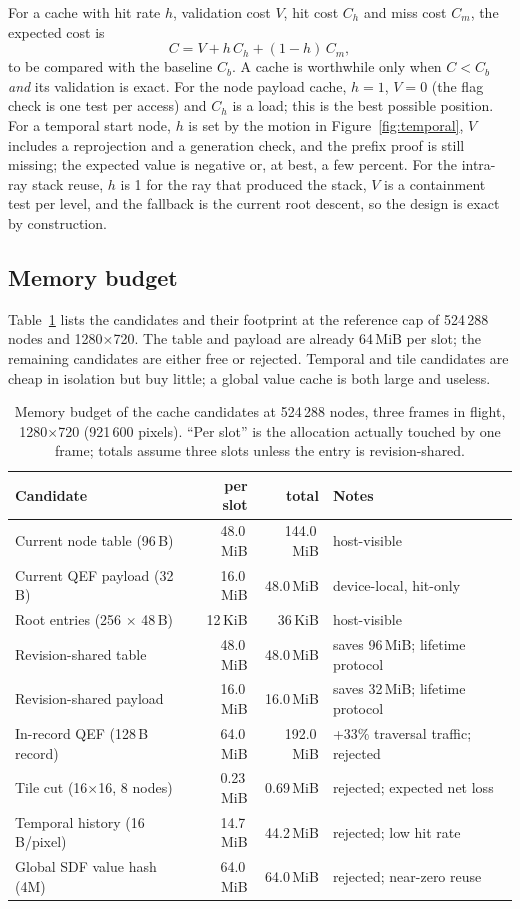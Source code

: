 \documentclass[11pt,a4paper]{article}
\theoremstyle{plain}
\theoremstyle{definition}
\theoremstyle{remark}
\begin{document}
For a cache with hit rate $h$, validation cost $V$, hit cost $C_h$ and miss
cost $C_m$, the expected cost is
\begin{equation}
C = V + h\,C_h + (1-h)\,C_m ,
\end{equation}
to be compared with the baseline $C_b$. A cache is worthwhile only when
$C<C_b$ \emph{and} its validation is exact. For the node payload cache,
$h=1$, $V=0$ (the flag check is one test per access) and $C_h$ is a load; this
is the best possible position. For a temporal start node, $h$ is set by the
motion in Figure~\ref{fig:temporal}, $V$ includes a reprojection and a
generation check, and the prefix proof is still missing; the expected value is
negative or, at best, a few percent. For the intra-ray stack reuse, $h$ is 1
for the ray that produced the stack, $V$ is a containment test per level, and
the fallback is the current root descent, so the design is exact by
construction.

\subsection{Memory budget}

Table~\ref{tab:memory} lists the candidates and their footprint at the
reference cap of 524\,288 nodes and 1280$\times$720. The table and payload are
already 64\,MiB per slot; the remaining candidates are either free or rejected.
Temporal and tile candidates are cheap in isolation but buy little; a global
value cache is both large and useless.

\begin{table}[t]
\centering
\small
\caption{Memory budget of the cache candidates at 524\,288 nodes, three
frames in flight, 1280$\times$720 (921\,600 pixels). ``Per slot'' is the
allocation actually touched by one frame; totals assume three slots unless the
entry is revision-shared.}
\label{tab:memory}
\begin{tabularx}{\linewidth}{@{}lrrX@{}}
\toprule
Candidate & per slot & total & Notes \\
\midrule
Current node table (96\,B) & 48.0\,MiB & 144.0\,MiB & host-visible \\
Current QEF payload (32\,B) & 16.0\,MiB & 48.0\,MiB & device-local, hit-only \\
Root entries (256 $\times$ 48\,B) & 12\,KiB & 36\,KiB & host-visible \\
Revision-shared table & 48.0\,MiB & 48.0\,MiB & saves 96\,MiB; lifetime protocol \\
Revision-shared payload & 16.0\,MiB & 16.0\,MiB & saves 32\,MiB; lifetime protocol \\
In-record QEF (128\,B record) & 64.0\,MiB & 192.0\,MiB & +33\% traversal traffic; rejected \\
Tile cut (16$\times$16, 8 nodes) & 0.23\,MiB & 0.69\,MiB & rejected; expected net loss \\
Temporal history (16\,B/pixel) & 14.7\,MiB & 44.2\,MiB & rejected; low hit rate \\
Global SDF value hash (4M) & 64.0\,MiB & 64.0\,MiB & rejected; near-zero reuse \\
\bottomrule
\end{tabularx}
\end{table}
\end{document}
